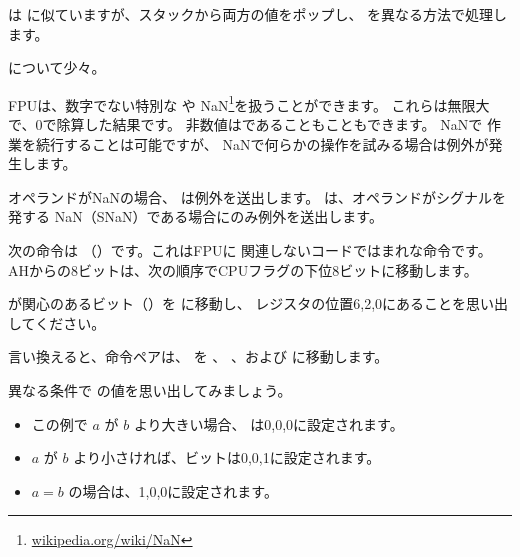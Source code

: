 ﻿




\FUCOMPP{} は \FCOM に似ていますが、スタックから両方の値をポップし、
 を異なる方法で処理します。

 について少々。

\newcommand{\NANFN}{\footnote{\href{http://go.yurichev.com/17130}{wikipedia.org/wiki/NaN}}}

FPUは、数字でない特別な や \gls{NaN}\NANFN を扱うことができます。 
これらは無限大で、0で除算した結果です。
非数値はであることもこともできます。 NaNで
作業を続行することは可能ですが、 NaNで何らかの操作を試みる場合は例外が発生します。


オペランドが\gls{NaN}の場合、 \FCOM は例外を送出します。 
\FUCOM は、オペランドがシグナルを発する \gls{NaN}（SNaN）である場合にのみ例外を送出します。

\label{SAHF}

次の命令は \SAHF （）です。これはFPUに
関連しないコードではまれな命令です。
AHからの8ビットは、次の順序でCPUフラグの下位8ビットに移動します。




\FNSTSW が関心のあるビット（\CThreeBits）を \AH に移動し、
\AH レジスタの位置6,2,0にあることを思い出してください。



言い換えると、命令ペアは、 \CThreeBits を \ZF 、 \PF 、および \CF に移動します。

異なる条件で \CThreeBits の値を思い出してみましょう。

\begin{itemize}
\item この例で $a$ が $b$ より大きい場合、 \CThreeBits は0,0,0に設定されます。
\item $a$ が $b$ より小さければ、ビットは0,0,1に設定されます。
\item $a=b$ の場合は、1,0,0に設定されます。
\end{itemize}

